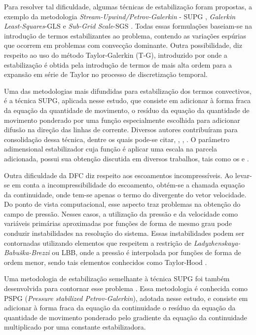 \documentclass[tese_patricia.tex]{subfiles}
\begin{document}
Para resolver tal dificuldade, algumas técnicas de estabilização foram propostas, a exemplo da metodologia \textit{Stream-Upwind/Petrov-Galerkin} - SUPG \cite{BrooksH:1982}, \textit{Galerkin Least-Squares}-GLS \cite{HughesFH:1989}  e \textit{Sub-Grid Scale}-SGS \cite{Hughes:1995}. Todas essas formulações baseiam-se na introdução de termos estabilizantes ao problema, contendo as variações espúrias que ocorrem em problemas com convecção dominante. Outra possibilidade, diz respeito ao uso do método Taylor-Galerkin (T-G), introduzido por  onde a estabilização é obtida pela introdução de termos de mais alta ordem para a expansão em série de Taylor no processo de discretização temporal.

Uma das metodologias mais difundidas para estabilização dos termos convectivos, é a técnica SUPG, aplicada nesse estudo, que consiste em adicionar à forma fraca da equação da quantidade de movimento, o resíduo da equação da quantidade de movimento ponderado por uma função especialmente escolhida para adicionar difusão na direção das linhas de corrente. Diversos autores contribuíram para consolidação dessa técnica, dentre os quais pode-se citar, , , . O parâmetro adimensional estabilizador cuja função é aplicar uma escala na parcela adicionada, possui sua obtenção discutida em diversos trabalhos, tais como os  e .

Outra dificuldade da DFC diz respeito aos escoamentos incompressíveis. Ao levar-se em conta a incompressibilidade do escoamento, obtém-se a chamada equação da continuidade, onde tem-se apenas o termo do divergente do vetor velocidade. Do ponto de vista computacional, esse aspecto traz problemas na obtenção do campo de pressão. Nesses casos, a utilização da pressão e da velocidade como variáveis primárias aproximadas por funções de forma de mesmo grau pode conduzir instabilidades na resolução do sistema. Essas instabilidades podem ser contornadas utilizando elementos que respeitem a restrição de \textit{Ladyzhenskaya-Babuška-Brezzi} ou LBB, onde a pressão é interpolada por funções de forma de ordem menor, sendo tais elementos conhecidos como Taylor-Hood \cite{BrezziF:1991,ZienkiewiczTN:2005,StrangF:2008}.

Uma metodologia de estabilização semelhante à técnica SUPG foi também desenvolvida para contornar esse problema \cite{HughesFB:1986,TezduyarMRS:1992a}. Essa metodologia é conhecida como PSPG (\textit{Pressure stabilized Petrov-Galerkin}), adotada nesse estudo, e consiste em adicionar à forma fraca da equação da continuidade o resíduo da equação da quantidade de movimento ponderado pelo gradiente da equação da continuidade multiplicado por uma constante estabilizadora. 
\end{document}
